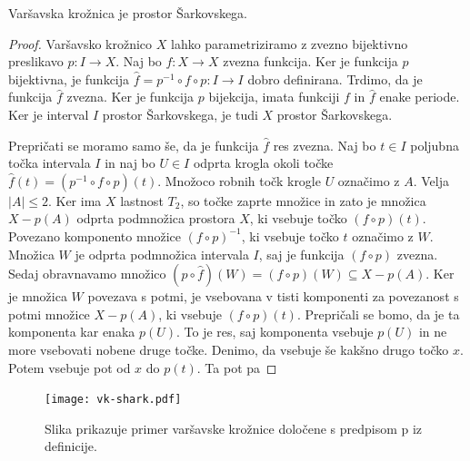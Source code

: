 \documentclass[../TG_magistrsko_delo_sections.tex]{subfiles}
\begin{document}
\begin{trditev}
Varšavska krožnica je prostor Šarkovskega.
\end{trditev}


\begin{proof}
Varšavsko krožnico $X$ lahko parametriziramo z zvezno bijektivno preslikavo $p:I \to X$. Naj bo $f: X \to X$ zvezna funkcija. Ker je funkcija $p$ bijektivna, je funkcija $\widehat{f} = p^{-1} \circ f \circ p : I \to I$ dobro definirana. Trdimo, da je funkcija $\widehat{f}$ zvezna. Ker je funkcija $p$ bijekcija, imata funkciji $f$ in $\widehat{f}$ enake periode. Ker je interval $I$ prostor Šarkovskega, je tudi $X$ prostor Šarkovskega. 

Prepričati se moramo samo še, da je funkcija $\widehat{f}$ res zvezna. Naj bo $t \in I$ poljubna točka intervala $I$ in naj bo $U \in I$ odprta krogla okoli točke $\widehat{f}(t) = (p^{-1} \circ f \circ p)(t)$. Množoco robnih točk krogle $U$ označimo z $A$. Velja $|A| \leq 2$. Ker ima $X$ lastnost $T_2$, so točke zaprte množice in zato je množica $X - p(A)$ odprta podmnožica prostora $X$, ki vsebuje točko $(f \circ p)(t)$. Povezano komponento množice $(f \circ p)^{-1}$, ki vsebuje točko $t$ označimo z $W$. Množica $W$ je odprta podmnožica intervala $I$, saj je funkcija $(f \circ p)$ zvezna. Sedaj obravnavamo množico $\left(p \circ \widehat{f}\right) (W) = (f \circ p)(W) \subseteq X - p(A)$. Ker je množica $W$ povezava s potmi, je vsebovana v tisti komponenti za povezanost s potmi množice $X-p(A)$, ki vsebuje $(f \circ p)(t)$. 
Prepričali se bomo, da je ta komponenta kar enaka $p(U)$. To je res, saj komponenta vsebuje $p(U)$ in ne more vsebovati nobene druge točke. Denimo, da vsebuje še kakšno drugo točko $x$. Potem vsebuje pot od $x$ do $p(t)$. Ta pot pa  
\end{proof}

\begin{figure}[h]
  \centering
  \texttt{[image: vk-shark.pdf]}
  \caption[Varšavska krožnica]{Slika prikazuje primer varšavske krožnice določene s predpisom p iz definicije.}
  \label{fig:varšavski}
\end{figure}
\end{document}
